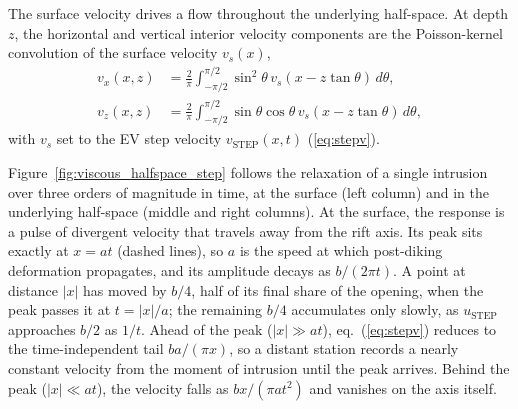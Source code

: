 \documentclass[extra]{gji}
\begin{document}
The surface velocity drives a flow throughout the underlying half-space.
At depth $z$, the horizontal and vertical interior velocity components
are the Poisson-kernel convolution of the
surface velocity $v_s(x)$,
\begin{equation}
\begin{split}
v_x(x,z) &= \frac{2}{\pi}\int_{-\pi/2}^{\pi/2} \sin^2\theta\, v_s(x-z\tan\theta)\,d\theta, \\
v_z(x,z) &= \frac{2}{\pi}\int_{-\pi/2}^{\pi/2} \sin\theta\cos\theta\, v_s(x-z\tan\theta)\,d\theta,
\end{split}
\label{eq:halfspace_kernel}
\end{equation}
with $v_s$ set to the EV step velocity $v_{\text{STEP}}(x,t)$ (\ref{eq:stepv}).

Figure~\ref{fig:viscous_halfspace_step} follows the relaxation of a
single intrusion over three orders of magnitude in time, at the surface
(left column) and in the underlying half-space (middle and right
columns). At the surface, the response is a pulse of divergent velocity
that travels away from the rift axis. Its peak sits exactly at
$x = at$ (dashed lines), so $a$ is the speed at which post-diking
deformation propagates, and its amplitude decays as $b/(2\pi t)$.
A point at distance $|x|$ has moved by $b/4$, half of its final share
of the opening, when the peak passes it at $t = |x|/a$; the remaining
$b/4$ accumulates only slowly, as $u_{\text{STEP}}$ approaches $b/2$
as $1/t$. Ahead of the peak ($|x| \gg at$), eq.~(\ref{eq:stepv})
reduces to the time-independent tail $ba/(\pi x)$, so a distant station
records a nearly constant velocity from the moment of intrusion until
the peak arrives. Behind the peak ($|x| \ll at$), the velocity falls
as $bx/(\pi a t^2)$ and vanishes on the axis itself.
\end{document}
